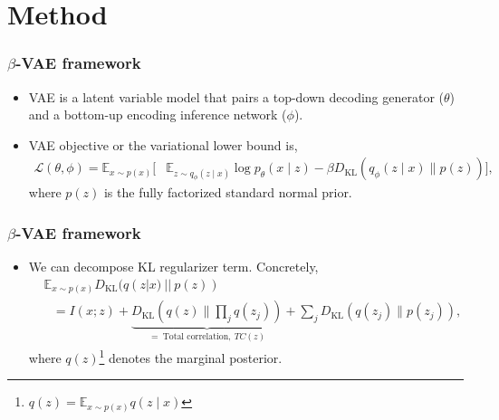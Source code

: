 \documentclass[10pt,mathserif]{beamer}
\begin{document}
\section{Method}
\begin{frame}
\frametitle{$\beta$-VAE framework}
\begin{itemize}\itemsep=20pt
\item VAE is a latent variable model that pairs a top-down decoding generator ($\theta$) and a bottom-up encoding inference network ($\phi$).\pause
\item VAE objective or the variational lower bound is,
\begin{align}
\mathcal{L}(\theta,\phi) = \mathbb{E}_{x \sim p(x)} \big[&\mathbb{E}_{z \sim q_\phi(z \mid x)} \log p_\theta(x \mid z)- \beta D_\text{KL}\left(q_\phi(z \mid x) \parallel p(z)\right)\big],\nonumber
\end{align}
where $p(z)$ is the fully factorized standard normal prior.\pause
\end{itemize}
\end{frame}

\begin{frame}
\frametitle{$\beta$-VAE framework}
\begin{itemize}\itemsep=12pt
\item We can decompose KL regularizer term. Concretely,
\begin{align}
&\mathbb{E}_{x \sim p(x)} D_\text{KL}(q(z| x) ~||~ p(z))\nonumber \\
&~~~=I(x;z) + \underbrace{D_\text{KL}(q(z) \parallel \prod_j q(z_j))}_{=~\text{Total correlation},~ TC(z)} + \sum_j D_\text{KL}(q(z_j) \parallel p(z_j)),\nonumber
\end{align}
where $q(z)$\footnote{$q(z) = \mathbb{E}_{x\sim p(x)} q(z\mid x)$} denotes the marginal posterior. 
\end{itemize}
\end{frame}
\end{document}
